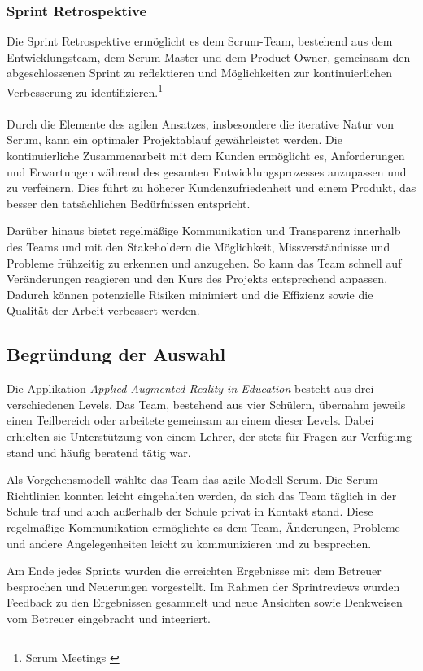 \subsubsection*{Sprint Retrospektive}
Die Sprint Retrospektive ermöglicht es dem Scrum-Team, bestehend aus dem Entwicklungsteam, dem Scrum Master und dem Product
Owner, gemeinsam den abgeschlossenen Sprint zu reflektieren und Möglichkeiten zur kontinuierlichen Verbesserung zu
identifizieren.\footnote{Scrum Meetings \cite{Sprint Retroperspektiv}}
\\
\\

Durch die Elemente des agilen Ansatzes, insbesondere die iterative Natur von Scrum, kann ein optimaler Projektablauf
gewährleistet werden. Die kontinuierliche Zusammenarbeit mit dem Kunden ermöglicht es, Anforderungen und Erwartungen während
des gesamten Entwicklungsprozesses anzupassen und zu verfeinern. Dies führt zu höherer Kundenzufriedenheit und einem
Produkt, das besser den tatsächlichen Bedürfnissen entspricht.

Darüber hinaus bietet regelmäßige Kommunikation und Transparenz innerhalb des Teams und mit den Stakeholdern die Möglichkeit,
Missverständnisse und Probleme frühzeitig zu erkennen und anzugehen. So kann das Team schnell auf Veränderungen reagieren
und den Kurs des Projekts entsprechend anpassen. Dadurch können potenzielle Risiken minimiert und die Effizienz sowie
die Qualität der Arbeit verbessert werden.

\subsection{Begründung der Auswahl}
Die Applikation \textit{Applied Augmented Reality in Education} besteht aus drei verschiedenen Levels. Das Team, bestehend
aus vier Schülern, übernahm jeweils einen Teilbereich oder arbeitete gemeinsam an einem dieser Levels. Dabei erhielten
sie Unterstützung von einem Lehrer, der stets für Fragen zur Verfügung stand und häufig beratend tätig war.

Als Vorgehensmodell wählte das Team das agile Modell Scrum. Die Scrum-Richtlinien konnten leicht eingehalten werden, da
sich das Team täglich in der Schule traf und auch außerhalb der Schule privat in Kontakt stand. Diese regelmäßige
Kommunikation ermöglichte es dem Team, Änderungen, Probleme und andere Angelegenheiten leicht zu kommunizieren und zu besprechen.

Am Ende jedes Sprints wurden die erreichten Ergebnisse mit dem Betreuer besprochen und Neuerungen vorgestellt. Im Rahmen
der Sprintreviews wurden Feedback zu den Ergebnissen gesammelt und neue Ansichten sowie Denkweisen vom Betreuer eingebracht
und integriert.

